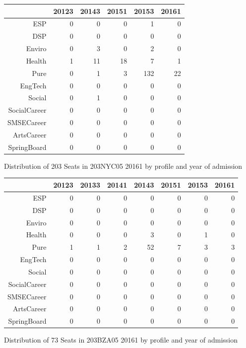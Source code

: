 \documentclass{article}\usepackage[]{graphicx}\usepackage[]{color}
\begin{document}
\begin{figure}[H]
\centering
\begin{tabular}{rrrrrr}
  \hline
 & 20123 & 20143 & 20151 & 20153 & 20161 \\ 
  \hline
ESP &   0 &   0 &   0 &   1 &   0 \\ 
  DSP &   0 &   0 &   0 &   0 &   0 \\ 
  Enviro &   0 &   3 &   0 &   2 &   0 \\ 
  Health &   1 &  11 &  18 &   7 &   1 \\ 
  Pure &   0 &   1 &   3 & 132 &  22 \\ 
  EngTech &   0 &   0 &   0 &   0 &   0 \\ 
  Social &   0 &   1 &   0 &   0 &   0 \\ 
  SocialCareer &   0 &   0 &   0 &   0 &   0 \\ 
  SMSECareer &   0 &   0 &   0 &   0 &   0 \\ 
  ArtsCareer &   0 &   0 &   0 &   0 &   0 \\ 
  SpringBoard &   0 &   0 &   0 &   0 &   0 \\ 
   \hline
\end{tabular}
\caption{Distribution of 203 Seats in 203NYC05 20161 by profile and year of admission} 
\end{figure}
\begin{figure}[H]
\centering
\begin{tabular}{rrrrrrrr}
  \hline
 & 20123 & 20133 & 20141 & 20143 & 20151 & 20153 & 20161 \\ 
  \hline
ESP &   0 &   0 &   0 &   0 &   0 &   0 &   0 \\ 
  DSP &   0 &   0 &   0 &   0 &   0 &   0 &   0 \\ 
  Enviro &   0 &   0 &   0 &   0 &   0 &   0 &   0 \\ 
  Health &   0 &   0 &   0 &   3 &   0 &   1 &   0 \\ 
  Pure &   1 &   1 &   2 &  52 &   7 &   3 &   3 \\ 
  EngTech &   0 &   0 &   0 &   0 &   0 &   0 &   0 \\ 
  Social &   0 &   0 &   0 &   0 &   0 &   0 &   0 \\ 
  SocialCareer &   0 &   0 &   0 &   0 &   0 &   0 &   0 \\ 
  SMSECareer &   0 &   0 &   0 &   0 &   0 &   0 &   0 \\ 
  ArtsCareer &   0 &   0 &   0 &   0 &   0 &   0 &   0 \\ 
  SpringBoard &   0 &   0 &   0 &   0 &   0 &   0 &   0 \\ 
   \hline
\end{tabular}
\caption{Distribution of 73 Seats in 203BZA05 20161 by profile and year of admission} 
\end{figure}
\end{document}
